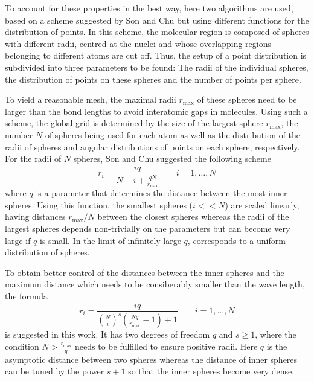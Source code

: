 To account for these properties in the best way, here two algorithms are used, based on a scheme suggested by Son and Chu \cite{Son_Chu} but using different functions for the distribution of points.
In this scheme, the molecular region is composed of spheres with different radii, centred at the nuclei and whose overlapping regions belonging to different atoms are cut off.
Thus, the setup of a point distribution is subdivided into three parameters to be found: The radii of the individual spheres, the distribution of points on these spheres and the number of points per sphere.

To yield a reasonable mesh, the maximal radii $r_\text{max}$ of these spheres need to be larger than the bond lengths to avoid interatomic gaps in molecules.
Using such a scheme, the global grid is determined by the size of the largest sphere $r_\text{max}$, the number $N$ of spheres being used for each atom as well as the distribution of the radii of spheres and angular distributions of points on each sphere, respectively.
For the radii of $N$ spheres, Son and Chu \cite{Son_Chu0} suggested the following scheme
\begin{equation} \label{eq:son_map}
r_i=\frac{iq}{N-i+\frac{qN}{r_\text{max}}} \qquad i=1,\hdots ,N 
\end{equation}
where $q$ is a parameter that determines the distance between the most inner spheres.
Using this function, the smallest spheres ($i<<N$) are scaled linearly, having distances $r_\text{max}/N$ between the closest spheres whereas the radii of the largest spheres depends non-trivially on the parameters but can become very large if $q$ is small.
In the limit of infinitely large $q$,  corresponds to a uniform distribution of spheres.

To obtain better control of the distances between the inner spheres and the maximum distance which needs to be consiberably smaller than the wave length, the formula
\begin{equation} \label{eq:tm_map}
r_i=\frac{iq}{\left( \frac Ni \right)^s \left(\frac{Nq}{r_\text{max}}-1\right) +1} \qquad i=1,\hdots ,N 
\end{equation}
is suggested in this work.
It has two degrees of freedom $q$ and $s\geq 1$, where the condition $N>\frac{r_\text{max}}{q}$ needs to be fulfilled to ensure positive radii.
Here $q$ is the asymptotic distance between two spheres whereas the distance of inner spheres can be tuned by the power $s+1$ so that the inner spheres become very dense.

